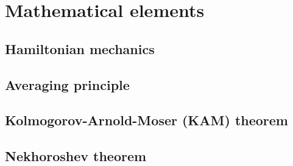 
\chapter{Mathematical elements}\label{ch:mathematical_elements}

\section{Hamiltonian mechanics}\label{sec:1:hamiltonian}

\section{Averaging principle}\label{sec:1:averaging}

\section{Kolmogorov-Arnold-Moser (KAM) theorem}\label{sec:1:kam}

\section{Nekhoroshev theorem}\label{sec:1:nekhoroshev}


